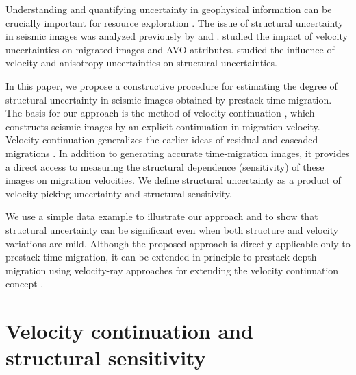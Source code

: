 Understanding and quantifying uncertainty in geophysical information
can be crucially important for resource exploration \cite[]{caers}. The
issue of structural uncertainty in seismic images was analyzed
previously by \cite{GEO67-03-08400852} and
\cite{GEO70-02-S39S42}. \cite{GEO66-04-12081216} studied the impact of
velocity uncertainties on migrated images and AVO
attributes. \cite{SEG-2004-21882191,SEG-2004-21922195} studied the
influence of velocity and anisotropy uncertainties on structural
uncertainties.

In this paper, we propose a constructive procedure for estimating the
degree of structural uncertainty in seismic images obtained by
prestack time migration. The basis for our approach is the method of
velocity continuation \cite[]{me,hubral,GEO68-05-16621672,GEO68-05-16501661,will}, which
constructs seismic images by an explicit continuation in migration
velocity. Velocity continuation generalizes the earlier ideas of
residual and cascaded migrations
\cite[]{SEG-1982-S1.4,GEO50-01-01100126,GEO52-05-06180643}. In addition to
generating accurate time-migration images, it provides a direct access
to measuring the structural dependence (sensitivity) of these images
on migration velocities. We define structural uncertainty as a 
product of velocity picking uncertainty and structural sensitivity.

We use a simple data example to illustrate our approach and to show
that structural uncertainty can be significant even when both
structure and velocity variations are mild. Although the proposed
approach is directly applicable only to prestack time migration, it
can be extended in principle to prestack depth migration using
velocity-ray approaches for extending the velocity continuation
concept \cite[]{GEO67-01-01260134,iversen,duchkov}.

\section{Velocity continuation and structural sensitivity}




